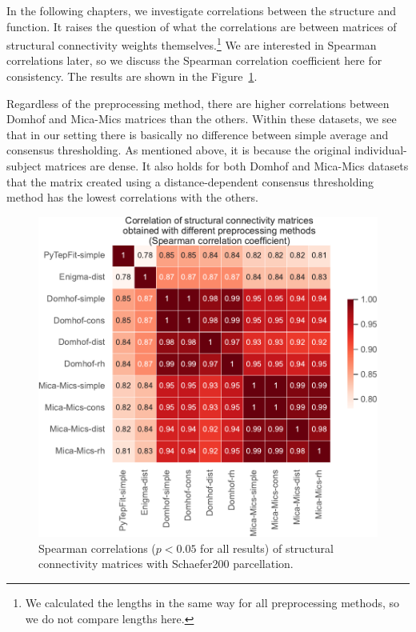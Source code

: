 In the following chapters, we investigate correlations between the structure and function. It raises the question of what the correlations are between matrices of structural connectivity weights themselves.\footnote{We calculated the lengths in the same way for all preprocessing methods, so we do not compare lengths here.} We are interested in Spearman correlations later, so we discuss the Spearman correlation coefficient here for consistency. The results are shown in the Figure~\ref{fig:sc_correlations}. 

Regardless of the preprocessing method, there are higher correlations between Domhof and Mica-Mics matrices than the others. Within these datasets, we see that in our setting there is basically no difference between simple average and consensus thresholding. As mentioned above, it is because the original individual-subject matrices are dense. It also holds for both Domhof and Mica-Mics datasets that the matrix created using a distance-dependent consensus thresholding method has the lowest correlations with the others.

\begin{figure}[p]
  \begin{center}
    \includegraphics[width=\textwidth]{images/nootebook_generated/comparing_sc_matrices/schaefer/correlations_all_matrices_Spearman.pdf}
  \end{center}
  \caption[Correlations of SC matrices (Schaefer200 parcellation)]{Spearman correlations ($p<0.05$ for all results) of structural connectivity matrices with Schaefer200 parcellation. }
  \label{fig:sc_correlations}
\end{figure}


